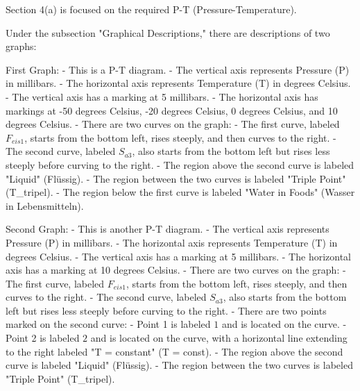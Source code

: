 Section 4(a) is focused on the required P-T (Pressure-Temperature).

Under the subsection "Graphical Descriptions," there are descriptions of two graphs:

First Graph:
- This is a P-T diagram.
- The vertical axis represents Pressure (P) in millibars.
- The horizontal axis represents Temperature (T) in degrees Celsius.
- The vertical axis has a marking at 5 millibars.
- The horizontal axis has markings at -50 degrees Celsius, -20 degrees Celsius, 0 degrees Celsius, and 10 degrees Celsius.
- There are two curves on the graph:
  - The first curve, labeled \( F_{eis1} \), starts from the bottom left, rises steeply, and then curves to the right.
  - The second curve, labeled \( S_{a3} \), also starts from the bottom left but rises less steeply before curving to the right.
- The region above the second curve is labeled "Liquid" (Flüssig).
- The region between the two curves is labeled "Triple Point" (T_{tripel}).
- The region below the first curve is labeled "Water in Foods" (Wasser in Lebensmitteln).

Second Graph:
- This is another P-T diagram.
- The vertical axis represents Pressure (P) in millibars.
- The horizontal axis represents Temperature (T) in degrees Celsius.
- The vertical axis has a marking at 5 millibars.
- The horizontal axis has a marking at 10 degrees Celsius.
- There are two curves on the graph:
  - The first curve, labeled \( F_{eis1} \), starts from the bottom left, rises steeply, and then curves to the right.
  - The second curve, labeled \( S_{a3} \), also starts from the bottom left but rises less steeply before curving to the right.
- There are two points marked on the second curve:
  - Point 1 is labeled \( 1 \) and is located on the curve.
  - Point 2 is labeled \( 2 \) and is located on the curve, with a horizontal line extending to the right labeled "T = constant" (T = const).
- The region above the second curve is labeled "Liquid" (Flüssig).
- The region between the two curves is labeled "Triple Point" (T_{tripel}).